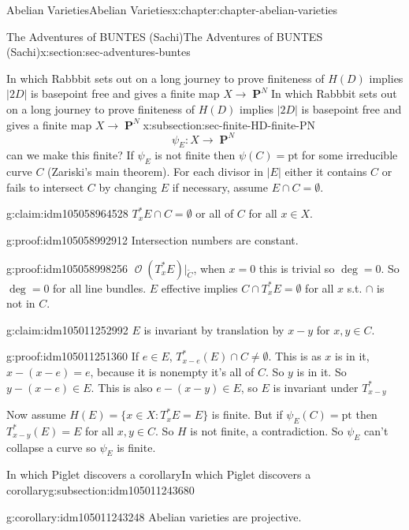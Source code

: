 \documentclass[oneside,10pt,]{book}
\numberwithin{equation}{section}
\newcommand{\sheaf}[1]{\operatorname{\mathcal{#1}}}
\DeclareMathOperator{\PP}{\mathbf{P}}
\begin{document}
\begin{chapterptx}{Abelian Varieties}{}{Abelian Varieties}{}{}{x:chapter:chapter-abelian-varieties}
\begin{sectionptx}{The Adventures of BUNTES (Sachi)}{}{The Adventures of BUNTES (Sachi)}{}{}{x:section:sec-adventures-buntes}
\begin{subsectionptx}{In which Rabbbit sets out on a long journey to prove finiteness of \(H(D)\) implies \(|2D|\) is basepoint free and gives a finite map \(X \to \PP^N\)}{}{In which Rabbbit sets out on a long journey to prove finiteness of \(H(D)\) implies \(|2D|\) is basepoint free and gives a finite map \(X \to \PP^N\)}{}{}{x:subsection:sec-finite-HD-finite-PN}
\begin{equation*}
\psi_E\colon X \to \PP^N
\end{equation*}
can we make this finite? If \(\psi_E\) is not finite then \(\psi(C) = \text{pt}\) for some irreducible curve \(C\) (Zariski's main theorem). For each divisor in \(|E|\) either it contains \(C\) or fails to intersect \(C\) by changing \(E\) if necessary, assume \(E \cap C = \emptyset\).%
\begin{claim}{}{}{g:claim:idm105058964528}%
\(T_x^*E\cap C= \emptyset\) or all of \(C\) for all \(x\in X\).%
\end{claim}
\begin{proofptx}{}{g:proof:idm105058992912}
Intersection numbers are constant.%
\end{proofptx}
\begin{proofptx}{}{g:proof:idm105058998256}
\(\sheaf O(T_x^*E)|_{\widetilde C}\), when \(x=0\) this is trivial so \(\deg =0\). So \(\deg = 0\) for all line bundles. \(E\) effective implies \(C\cap T_x^* E = \emptyset\) for all \(x\) s.t. \(\cap\) is not in \(C\).%
\end{proofptx}
\begin{claim}{}{}{g:claim:idm105011252992}%
\(E\) is invariant by translation by \(x - y\) for \(x,y \in C\).%
\end{claim}
\begin{proofptx}{}{g:proof:idm105011251360}
If \(e \in E\), \(T_{x-e}^*(E) \cap C \ne \emptyset\). This is as \(x\) is in it, \(x-(x-e) =e\), because it is nonempty it's all of \(C\). So \(y\) is in it. So \(y- (x-e) \in E\). This is also \(e - (x-y) \in E\), so \(E\) is invariant under \(T^*_{x-y}\)%
\end{proofptx}
Now assume \(H(E) = \{x\in X: T_x^*E  = E \}\) is finite. But if \(\psi_E(C) = \text{pt}\) then \(T_{x-y}^*(E)  = E\) for all \(x,y\in C\). So \(H\) is not finite, a contradiction. So \(\psi_E\) can't collapse a curve so \(\psi_E\) is finite.%
\end{subsectionptx}
%
%
\typeout{************************************************}
\typeout{************************************************}
%
\begin{subsectionptx}{In which Piglet discovers a corollary}{}{In which Piglet discovers a corollary}{}{}{g:subsection:idm105011243680}
\begin{corollary}{}{}{g:corollary:idm105011243248}%
Abelian varieties are projective.%
\end{corollary}

\end{subsectionptx}
\end{sectionptx}
\end{chapterptx}
\end{document}
